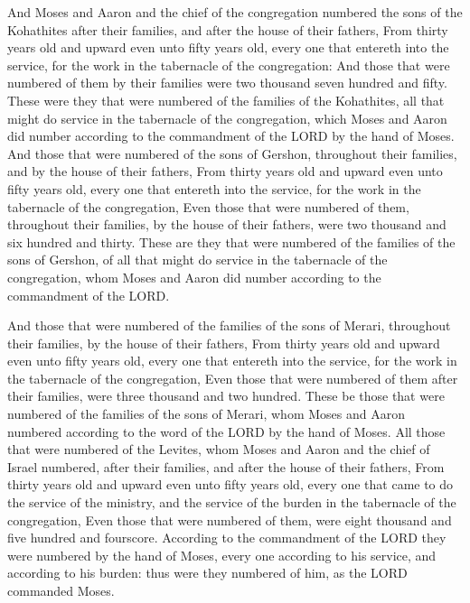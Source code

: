  And Moses and Aaron and the chief of the congregation
numbered the sons of the Kohathites after their families, and after the
house of their fathers,  From thirty years old and upward
even unto fifty years old, every one that entereth into the service, for
the work in the tabernacle of the congregation:  And those
that were numbered of them by their families were two thousand seven
hundred and fifty.  These were they that were numbered of
the families of the Kohathites, all that might do service in the
tabernacle of the congregation, which Moses and Aaron did number
according to the commandment of the LORD by the hand of Moses.
 And those that were numbered of the sons of Gershon,
throughout their families, and by the house of their fathers,
 From thirty years old and upward even unto fifty years
old, every one that entereth into the service, for the work in the
tabernacle of the congregation,  Even those that were
numbered of them, throughout their families, by the house of their
fathers, were two thousand and six hundred and thirty. 
These are they that were numbered of the families of the sons of
Gershon, of all that might do service in the tabernacle of the
congregation, whom Moses and Aaron did number according to the
commandment of the LORD.

 And those that were numbered of the families of the sons
of Merari, throughout their families, by the house of their fathers,
 From thirty years old and upward even unto fifty years
old, every one that entereth into the service, for the work in the
tabernacle of the congregation,  Even those that were
numbered of them after their families, were three thousand and two
hundred.  These be those that were numbered of the families
of the sons of Merari, whom Moses and Aaron numbered according to the
word of the LORD by the hand of Moses.  All those that were
numbered of the Levites, whom Moses and Aaron and the chief of Israel
numbered, after their families, and after the house of their fathers,
 From thirty years old and upward even unto fifty years
old, every one that came to do the service of the ministry, and the
service of the burden in the tabernacle of the congregation,
 Even those that were numbered of them, were eight thousand
and five hundred and fourscore.  According to the
commandment of the LORD they were numbered by the hand of Moses, every
one according to his service, and according to his burden: thus were
they numbered of him, as the LORD commanded Moses.


